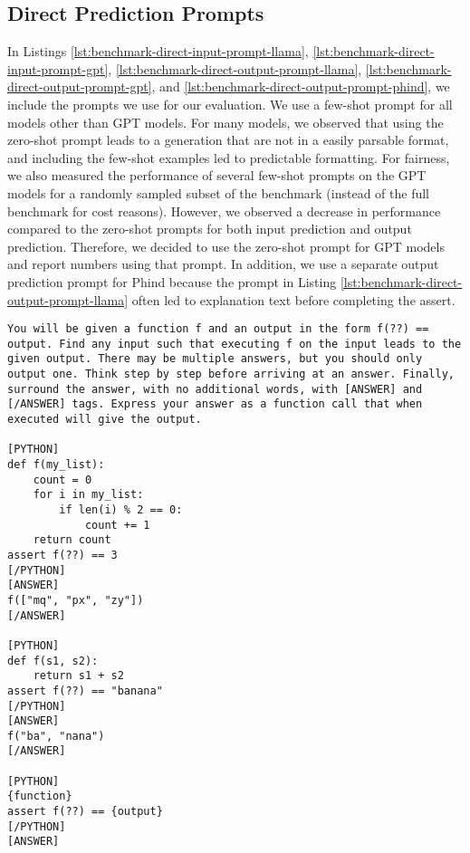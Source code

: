 \subsection{Direct Prediction Prompts} \label{sec:appendix-direct-prompts}
In Listings \ref{lst:benchmark-direct-input-prompt-llama}, \ref{lst:benchmark-direct-input-prompt-gpt}, \ref{lst:benchmark-direct-output-prompt-llama}, \ref{lst:benchmark-direct-output-prompt-gpt}, and \ref{lst:benchmark-direct-output-prompt-phind}, we include the prompts we use for our evaluation. We use a few-shot prompt for all models other than GPT models. For many models, we observed that using the zero-shot prompt leads to a generation that are not in a easily parsable format, and including the few-shot examples led to predictable formatting. For fairness, we also measured the performance of several few-shot prompts on the GPT models for a randomly sampled subset of the benchmark (instead of the full benchmark for cost reasons). However, we observed a decrease in performance compared to the zero-shot prompts for both input prediction and output prediction. Therefore, we decided to use the zero-shot prompt for GPT models and report numbers using that prompt. In addition, we use a separate output prediction prompt for Phind because the prompt in Listing  \ref{lst:benchmark-direct-output-prompt-llama} often led to explanation text before completing the assert. 

\begin{lstlisting}[caption={Input Prediction (non-GPT)},label={lst:benchmark-direct-input-prompt-llama}, captionpos=t, breaklines=true]
You will be given a function f and an output in the form f(??) == output. Find any input such that executing f on the input leads to the given output. There may be multiple answers, but you should only output one. Think step by step before arriving at an answer. Finally, surround the answer, with no additional words, with [ANSWER] and [/ANSWER] tags. Express your answer as a function call that when executed will give the output.

[PYTHON]
def f(my_list):
    count = 0
    for i in my_list:
        if len(i) % 2 == 0:
            count += 1
    return count
assert f(??) == 3
[/PYTHON]
[ANSWER]
f(["mq", "px", "zy"])
[/ANSWER]

[PYTHON]
def f(s1, s2):
    return s1 + s2
assert f(??) == "banana"
[/PYTHON]
[ANSWER]
f("ba", "nana")
[/ANSWER]

[PYTHON]
{function}
assert f(??) == {output}
[/PYTHON]
[ANSWER]
\end{lstlisting}

